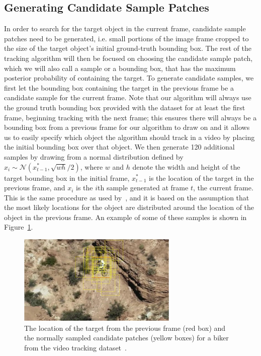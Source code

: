 \documentclass{sig-alternate-05-2015}
\begin{document}
\subsection{Generating Candidate Sample Patches}
In order to search for the target object in the current frame, candidate sample patches need to be generated, i.e. small portions of the image frame cropped to the size of the target object's initial ground-truth bounding box.
The rest of the tracking algorithm will then be focused on choosing the candidate sample patch, which we will also call a sample or a bounding box, that has the maximum posterior probability of containing the target. 
To generate candidate samples, we first let the bounding box containing the target in the previous frame be a candidate sample for the current frame.
Note that our algorithm will always use the ground truth bounding box provided with the dataset for at least the first frame, beginning tracking with the next frame; this ensures there will always be a bounding box from a previous frame for our algorithm to draw on and it allows us to easily specify which object the algorithm should track in a video by placing the initial bounding box over that object.
We then generate 120 additional samples by drawing from a normal distribution defined by $x_i \sim \mathcal{N}(x_{t-1}^*,\sqrt{wh}/2)$, where $w$ and $h$ denote the width and height of the target bounding box in the initial frame, $x_{t-1}^*$ is the location of the target in the previous frame, and $x_{i}$ is the $i$th sample generated at frame $t$, the current frame. 
This is the same procedure as used by~\cite{hong2015online}, and it is based on the assumption that the most likely locations for the object are distributed around the location of the object in the previous frame.
An example of some of these samples is shown in Figure~\ref{fig:patches}.

\begin{figure}[h]
\centering
\includegraphics[width = 3in]{samples}
\caption{The location of the target from the previous frame (red box) and the normally sampled candidate patches (yellow boxes) for a biker from the video tracking dataset~\cite{wu2013online}.}
\label{fig:patches}
\end{figure}
\end{document}
